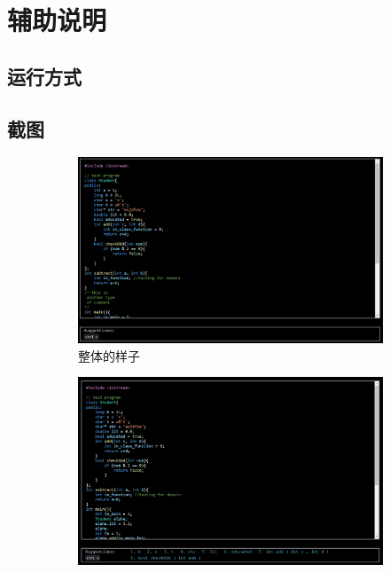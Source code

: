 \section{辅助说明}

\subsection{运行方式}

\subsection{截图}

\begin{figure}[h!]
    \centering
    \begin{subfigure}{0.45\textwidth}
        \centering
        \includegraphics[width=\linewidth]{imgs/整体的样子.png}
        \caption{整体的样子}
        \label{fig:1}
    \end{subfigure}
    \hspace{1em}
    \begin{subfigure}{0.45\linewidth}
        \centering
        \includegraphics[width=\linewidth]{imgs/类成员对象和成员函数补全.png}

\end{subfigure}
\end{figure}
